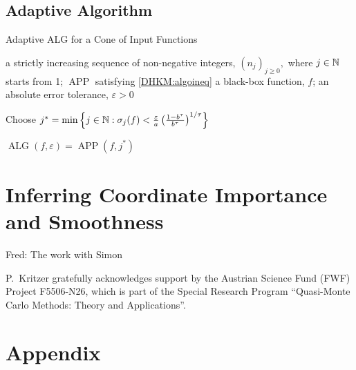 \documentclass[USenglish]{article}
\DeclareMathOperator{\APP}{APP}
\DeclareMathOperator{\ALG}{ALG}
\newcommand{\FredNote}[1]{{\color{blue}Fred: #1}}
\begin{document}
\subsection{Adaptive Algorithm}
\begin{algorithm}
	\caption{Adaptive ALG for a Cone of Input Functions} 
	\begin{algorithmic}
	\PARAM a strictly increasing sequence of non-negative integers, $(n_j)_{j\ge 0},$ where $j \in {\mathbb{N}}$ starts from 1;  $\APP$ satisfying \eqref{DHKM:algoineq}
		\INPUT a black-box function, $f$; an absolute error tolerance,
		$\varepsilon>0$

\Ensure  Choose $j^* =  \min \left \{j \in {\mathbb{N}} : 
\sigma_{j}(f) < \frac{\varepsilon}{a}\left(\frac{1 - b^\tau}{b^\tau} \right)^{1/\tau} 
\right \}$

\RETURN $\ALG(f,\varepsilon) = \APP(f,j^*)$
\end{algorithmic}
\end{algorithm}

\section{Inferring Coordinate Importance and Smoothness} 
\FredNote{The work with Simon}



\begin{acknowledgement}
 P.~Kritzer gratefully acknowledges support by the Austrian Science Fund (FWF) Project  F5506-N26, 
which is part of the Special Research Program ``Quasi-Monte Carlo Methods: Theory and Applications''.
\end{acknowledgement}





\section*{Appendix}
\end{document}
